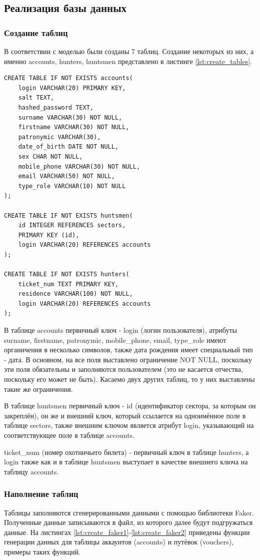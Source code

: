	\subsection{Реализация базы данных}	
		\subsubsection{Создание таблиц}
		В соответствии с моделью были созданы 7 таблиц. Создание некоторых из них, а именно accounts, hunters, huntsmen представлено в листинге \ref{lst:create_tables}.
		
		\begin{lstlisting}[caption = {Создание некоторых таблиц}, label=lst:create_tables]
CREATE TABLE IF NOT EXISTS accounts(
	login VARCHAR(20) PRIMARY KEY,
	salt TEXT,
	hashed_password TEXT,
	surname VARCHAR(30) NOT NULL,
	firstname VARCHAR(30) NOT NULL,
	patronymic VARCHAR(30),
	date_of_birth DATE NOT NULL,
	sex CHAR NOT NULL,
	mobile_phone VARCHAR(30) NOT NULL,
	email VARCHAR(50) NOT NULL,
	type_role VARCHAR(10) NOT NULL
);

CREATE TABLE IF NOT EXISTS huntsmen(
	id INTEGER REFERENCES sectors,
	PRIMARY KEY (id),
	login VARCHAR(20) REFERENCES accounts
);

CREATE TABLE IF NOT EXISTS hunters(
	ticket_num TEXT PRIMARY KEY,
	residence VARCHAR(100) NOT NULL,
	login VARCHAR(20) REFERENCES accounts
);
		\end{lstlisting}
	
		В таблице accounts первичный ключ - login (логин пользователя), атрибуты surname, firstname, patronymic, mobile\_phone, email, type\_role имеют органичения в несколько символов, также дата рождения имеет специальный тип - дата. В основном, на все поля выставлено ограничение NOT NULL, поскольку эти поля обязательны и заполняются пользователем (это не касается отчества, поскольку его может не быть). Касаемо двух других таблиц, то у них выставлены такие же ограничения.
		
		В таблице huntsmen первичный ключ - id (идентификатор сектора, за которым он закреплён), он же и внешний ключ, который ссылается на одноимённое поле в таблице sectors, также внешним ключом является атрибут login, указывающий на соответствующее поле в таблице accounts.
		
		ticket\_num (номер охотничьего билета) - первичный ключ в таблице hunters, а login также как и в таблице huntsmen выступает в качестве внешнего ключа на таблицу accounts.
			
		\subsubsection{Наполнение таблиц}
		Таблицы заполняются сгенерированными данными с помощью библиотеки Faker. Полученные данные записываются в файл, из которого далее будут подгружаться данные. На листингах \ref{lst:create_faker1}-\ref{lst:create_faker2} приведены функции генерации данных для таблицы аккаунтов (accounts) и путёвок (vouchers), примеры таких функций.
		
